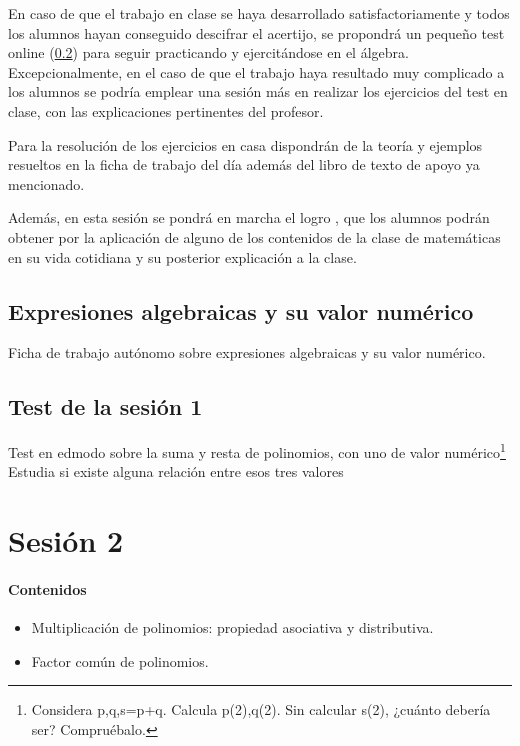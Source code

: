 En caso de que el trabajo en clase se haya desarrollado satisfactoriamente y todos los alumnos hayan conseguido descifrar el acertijo, se propondrá un pequeño test online (\ref{test:ses1}) para seguir practicando y ejercitándose en el álgebra.
%
Excepcionalmente, en el caso de que el trabajo haya resultado muy complicado a los alumnos se podría emplear una sesión más en realizar los ejercicios del test en clase, con las explicaciones pertinentes del profesor.

Para la resolución de los ejercicios en casa dispondrán de la teoría y ejemplos resueltos en la ficha de trabajo del día además del libro de texto de apoyo ya mencionado.

Además, en esta sesión se pondrá en marcha el logro , que los alumnos podrán obtener por la aplicación de alguno de los contenidos de la clase de matemáticas en su vida cotidiana y su posterior explicación a la clase.

\subsection{Expresiones algebraicas y su valor numérico}
\label{app:DocModel}

Ficha de trabajo autónomo sobre expresiones algebraicas y su valor numérico.

\subsection{Test de la sesión 1}
\label{test:ses1}

Test en edmodo sobre la suma y resta de polinomios, con uno de valor numérico\footnote{Considera p,q,s=p+q. Calcula p(2),q(2). Sin calcular s(2), ¿cuánto debería ser? Compruébalo.}
%
Estudia si existe alguna relación entre esos tres valores 



\section{Sesión 2}



\paragraph{Contenidos}
\begin{itemize}
	\item Multiplicación de polinomios: propiedad asociativa y distributiva.
	\item Factor común de polinomios.
\end{itemize}

